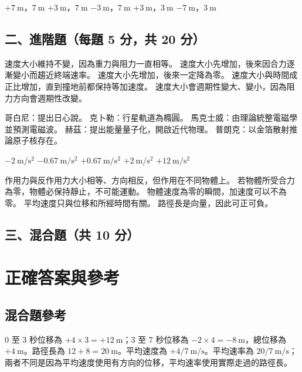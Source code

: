 \documentclass[10pt,a4paper]{article}
\begin{document}
{$+7\ \mathrm{m}$，$7\ \mathrm{m}$}
{$+3\ \mathrm{m}$，$7\ \mathrm{m}$}
{$-3\ \mathrm{m}$，$7\ \mathrm{m}$}
{$+3\ \mathrm{m}$，$3\ \mathrm{m}$}
{$-7\ \mathrm{m}$，$3\ \mathrm{m}$}
\subsection*{二、進階題（每題 5 分，共 20 分）}

{速度大小維持不變，因為重力與阻力一直相等。}
{速度大小先增加，後來因合力逐漸變小而趨近終端速率。}
{速度大小先增加，後來一定降為零。}
{速度大小與時間成正比增加，直到撞地前都保持等加速度。}
{速度大小會週期性變大、變小，因為阻力方向會週期性改變。}

{哥白尼：提出日心說。}
{克卜勒：行星軌道為橢圓。}
{馬克士威：由理論統整電磁學並預測電磁波。}
{赫茲：提出能量量子化，開啟近代物理。}
{普朗克：以金箔散射推論原子核存在。}

{$-2\ \mathrm{m}/\mathrm{s}^2$}
{$-0.67\ \mathrm{m}/\mathrm{s}^2$}
{$+0.67\ \mathrm{m}/\mathrm{s}^2$}
{$+2\ \mathrm{m}/\mathrm{s}^2$}
{$+12\ \mathrm{m}/\mathrm{s}^2$}

{作用力與反作用力大小相等、方向相反，但作用在不同物體上。}
{若物體所受合力為零，物體必保持靜止，不可能運動。}
{物體速度為零的瞬間，加速度可以不為零。}
{平均速度只與位移和所經時間有關。}
{路徑長是向量，因此可正可負。}
\subsection*{三、混合題（共 10 分）}


\newpage
\section*{正確答案與參考}
\begin{center}
\end{center}

\subsection*{混合題參考}
0 至 3 秒位移為 $+4\times 3=+12\ \mathrm{m}$；3 至 7 秒位移為 $-2\times 4=-8\ \mathrm{m}$，總位移為 $+4\ \mathrm{m}$。路徑長為 $12+8=20\ \mathrm{m}$。平均速度為 $+4/7\ \mathrm{m}/\mathrm{s}$。平均速率為 $20/7\ \mathrm{m}/\mathrm{s}$；兩者不同是因為平均速度使用有方向的位移，平均速率使用實際走過的路徑長。
\end{document}
